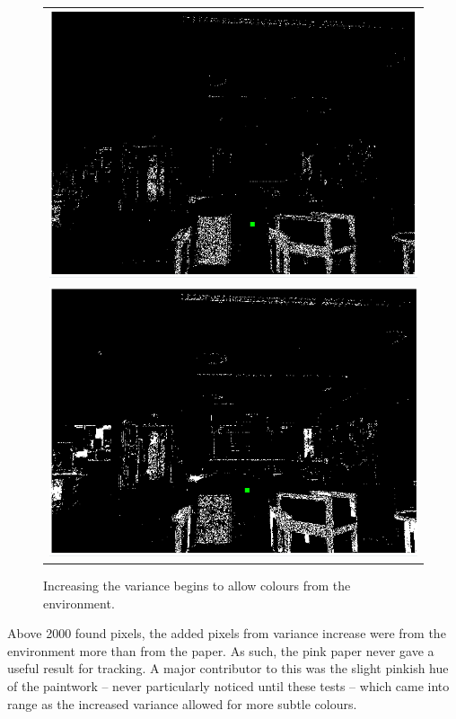 \begin{figure}
\begin{tabular}{ c }
    \includegraphics[scale=0.25]{zscreenshots/hsl_green_60}\\ 
    \includegraphics[scale=0.25]{zscreenshots/hsl_green_80}\\
  \end{tabular}
    \caption{Increasing the variance begins to allow colours from the environment.}
\end{figure}

Above 2000 found pixels, the added pixels from variance increase were from the environment more than from the paper. As such, the pink paper never gave a useful result for tracking. A major contributor to this was the slight pinkish hue of the paintwork – never particularly noticed until these tests – which came into range as the increased variance allowed for more subtle colours.\\



